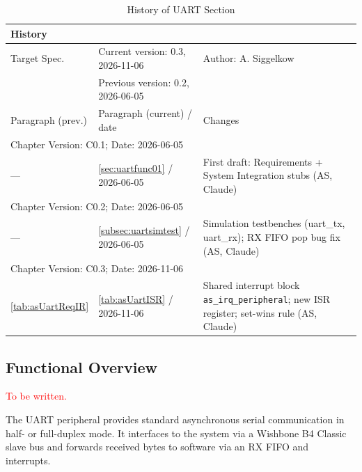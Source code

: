 \begin{table}[H]
\caption{History of UART Section}
\label{tab:uarthistory02}
\centering
\begin{tabularx}{\textwidth}{|X |X |X|}
  \hline
  \multicolumn{3}{|l|}{History} \\
  \hline
  \multicolumn{1}{|l}{Target Spec.} &
  \multicolumn{1}{l}{Current version: 0.3, 2026-11-06} &
  \multicolumn{1}{l|}{Author: A. Siggelkow} \\
  \multicolumn{1}{|l}{ } &
  \multicolumn{1}{l}{Previous version: 0.2, 2026-06-05} &
  \multicolumn{1}{l|}{ } \\
  \hline
  \hline
  Paragraph (prev.) & Paragraph (current) / date & Changes \\
  \hline
  \hline
  \multicolumn{3}{|l|}{Chapter Version: C0.1; Date: 2026-06-05} \\
  \hline
  --- & \ref{sec:uartfunc01} / 2026-06-05 & First draft: Requirements + System Integration stubs (AS, Claude) \\
  \hline
  \multicolumn{3}{|l|}{Chapter Version: C0.2; Date: 2026-06-05} \\
  \hline
  --- & \ref{subsec:uartsimtest} / 2026-06-05 & Simulation testbenches (uart\_tx, uart\_rx); RX FIFO pop bug fix (AS, Claude) \\
  \hline
  \multicolumn{3}{|l|}{Chapter Version: C0.3; Date: 2026-11-06} \\
  \hline
  \ref{tab:asUartReqIR} & \ref{tab:asUartISR} / 2026-11-06 & Shared interrupt block \texttt{as\_irq\_peripheral}; new ISR register; set-wins rule (AS, Claude) \\
  \hline
\end{tabularx}
\end{table}

\subsection{Functional Overview}
\label{subsec:uartfunc01}
\textcolor{red}{To be written.}

The UART peripheral provides standard asynchronous serial communication in
half- or full-duplex mode.
It interfaces to the system via a Wishbone B4 Classic slave bus and
forwards received bytes to software via an RX FIFO and interrupts.

